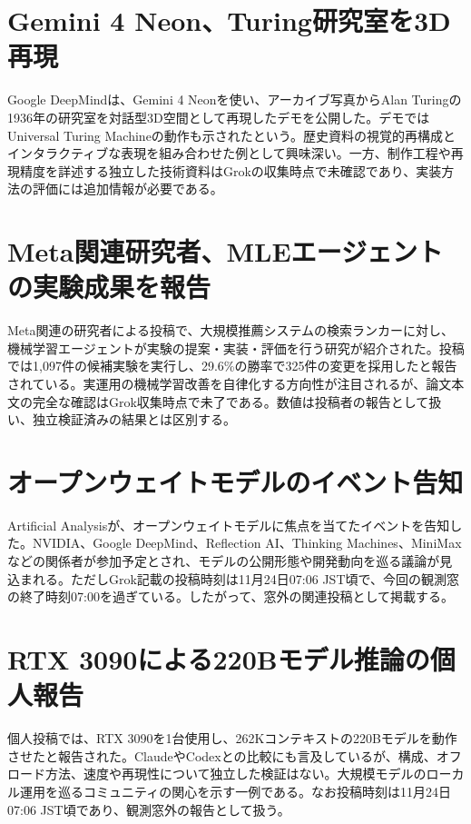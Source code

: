 \section{Gemini 4 Neon、Turing研究室を3D再現}
Google DeepMindは、Gemini 4 Neonを使い、アーカイブ写真からAlan Turingの1936年の研究室を対話型3D空間として再現したデモを公開した。デモではUniversal Turing Machineの動作も示されたという。歴史資料の視覚的再構成とインタラクティブな表現を組み合わせた例として興味深い。一方、制作工程や再現精度を詳述する独立した技術資料はGrokの収集時点で未確認であり、実装方法の評価には追加情報が必要である。

\section{Meta関連研究者、MLEエージェントの実験成果を報告}
Meta関連の研究者による投稿で、大規模推薦システムの検索ランカーに対し、機械学習エージェントが実験の提案・実装・評価を行う研究が紹介された。投稿では1,097件の候補実験を実行し、29.6\%の勝率で325件の変更を採用したと報告されている。実運用の機械学習改善を自律化する方向性が注目されるが、論文本文の完全な確認はGrok収集時点で未了である。数値は投稿者の報告として扱い、独立検証済みの結果とは区別する。

\section{オープンウェイトモデルのイベント告知}
Artificial Analysisが、オープンウェイトモデルに焦点を当てたイベントを告知した。NVIDIA、Google DeepMind、Reflection AI、Thinking Machines、MiniMaxなどの関係者が参加予定とされ、モデルの公開形態や開発動向を巡る議論が見込まれる。ただしGrok記載の投稿時刻は11月24日07:06 JST頃で、今回の観測窓の終了時刻07:00を過ぎている。したがって、窓外の関連投稿として掲載する。

\section{RTX 3090による220Bモデル推論の個人報告}
個人投稿では、RTX 3090を1台使用し、262Kコンテキストの220Bモデルを動作させたと報告された。ClaudeやCodexとの比較にも言及しているが、構成、オフロード方法、速度や再現性について独立した検証はない。大規模モデルのローカル運用を巡るコミュニティの関心を示す一例である。なお投稿時刻は11月24日07:06 JST頃であり、観測窓外の報告として扱う。
